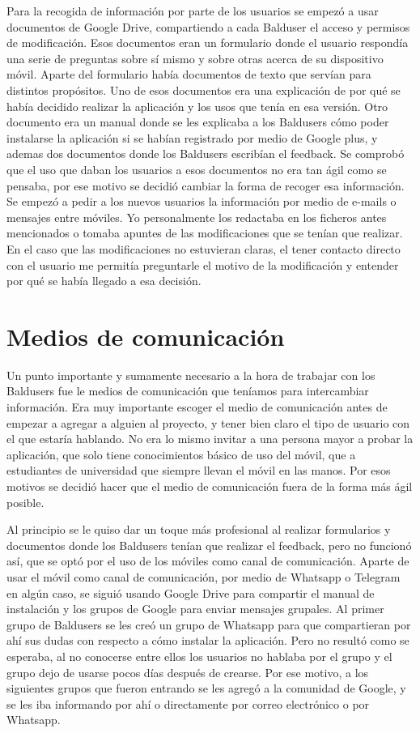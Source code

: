 Para la recogida de información por parte de los usuarios se empezó a usar documentos de Google Drive, compartiendo a cada Balduser el acceso y permisos de modificación.
Esos documentos eran un formulario donde el usuario respondía una serie de preguntas sobre sí mismo y sobre otras acerca de su dispositivo móvil. Aparte del formulario había documentos de texto que servían para distintos propósitos.
Uno de esos documentos era una explicación de por qué se había decidido realizar la aplicación y los usos que tenía en esa versión.
Otro documento era un manual donde se les explicaba a los Baldusers cómo poder instalarse la aplicación si se habían registrado por medio de Google plus, y ademas dos documentos donde los Baldusers escribían el feedback.
Se comprobó que el uso que daban los usuarios a esos documentos no era tan ágil como se pensaba, por ese motivo se decidió cambiar la forma de recoger esa información.
Se empezó a pedir a los nuevos usuarios la información por medio de e-mails o mensajes entre móviles. Yo personalmente los redactaba en los ficheros antes mencionados o tomaba apuntes de las modificaciones que se tenían que realizar.
En el caso que las modificaciones no estuvieran claras, el tener contacto directo con el usuario me permitía preguntarle el motivo de la modificación y entender por qué se había llegado a esa decisión.


\section{Medios de comunicación}
\label{secc:medios de comunicación}

Un punto importante y sumamente necesario a la hora de trabajar con los Baldusers fue le medios de comunicación que teníamos para intercambiar información.
Era muy importante escoger el medio de comunicación antes de empezar a agregar a alguien al proyecto, y tener bien claro el tipo de usuario con el que estaría hablando. No era lo mismo invitar a una persona mayor a probar la aplicación, que solo tiene conocimientos básico de uso del móvil, que a estudiantes de universidad que siempre llevan el móvil en las manos.
Por esos motivos se decidió hacer que el medio de comunicación fuera de la forma más ágil posible.

Al principio se le quiso dar un toque más profesional al realizar formularios y documentos donde los Baldusers tenían que realizar el feedback, pero no funcionó así, que se optó por el uso de los móviles como canal de comunicación.
Aparte de usar el móvil como canal de comunicación, por medio de Whatsapp o Telegram en algún caso, se siguió usando Google Drive para compartir el manual de instalación y los grupos de Google para enviar mensajes grupales.
Al primer grupo de Baldusers se les creó un grupo de Whatsapp para que compartieran por ahí sus dudas con respecto a cómo instalar la aplicación. Pero no resultó como se esperaba, al no conocerse entre ellos los usuarios no hablaba por el grupo y el grupo dejo de usarse pocos días después de crearse.
Por ese motivo, a los siguientes grupos que fueron entrando se les agregó a la comunidad de Google, y se les iba informando por ahí o directamente por correo electrónico o por Whatsapp.

